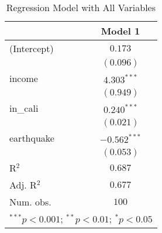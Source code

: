 
\begin{table}
\begin{center}
\begin{tabular}{l c}
\hline
 & Model 1 \\
\hline
(Intercept) & $0.173$        \\
            & $(0.096)$      \\
income      & $4.303^{***}$  \\
            & $(0.949)$      \\
in\_cali    & $0.240^{***}$  \\
            & $(0.021)$      \\
earthquake  & $-0.562^{***}$ \\
            & $(0.053)$      \\
\hline
R$^2$       & $0.687$        \\
Adj. R$^2$  & $0.677$        \\
Num. obs.   & $100$          \\
\hline
\multicolumn{2}{l}{\scriptsize{$^{***}p<0.001$; $^{**}p<0.01$; $^{*}p<0.05$}}
\end{tabular}
\caption{Regression Model with All Variables}
\label{tab:lm_full_model}
\end{center}
\end{table}
